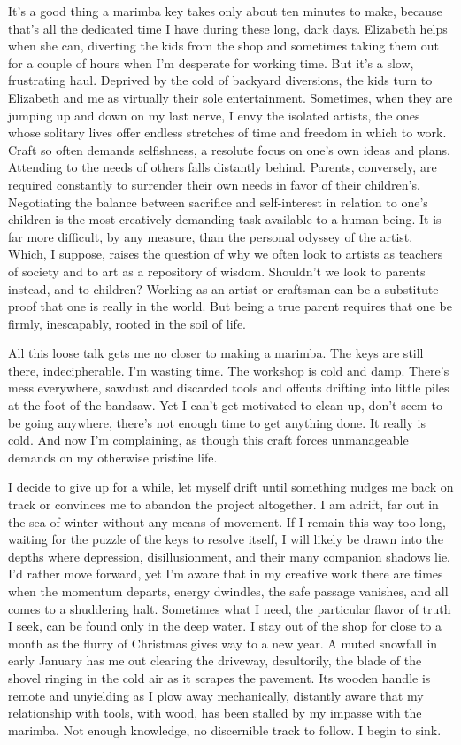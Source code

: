 \documentclass[letterpaper,10pt,headsepline]{scrreprt}
\begin{document}
It’s a good thing a marimba key takes only about ten minutes to make, because that’s all the dedicated time I have during these long, dark days. Elizabeth helps when she can, diverting the kids from the shop and sometimes taking them out for a couple of hours when I’m desperate for working time. But it’s a slow, frustrating haul. Deprived by the cold of backyard diversions, the kids turn to Elizabeth and me as virtually their sole entertainment. Sometimes, when they are jumping up and down on my last nerve, I envy the isolated artists, the ones whose solitary lives offer endless stretches of time and freedom in which to work. Craft so often demands selfishness, a resolute focus on one’s own ideas and plans. Attending to the needs of others falls distantly behind. Parents, conversely, are required constantly to surrender their own needs in favor of their children’s. Negotiating the balance between sacrifice and self-­interest in relation to one’s children is the most creatively demanding task available to a human being. It is far more difficult, by any measure, than the personal odyssey of the artist.
Which, I suppose, raises the question of why we often look to artists as teachers of society and to art as a repository of wisdom. ­Shouldn’t we look to parents instead, and to children? Working as an artist or craftsman can be a substitute proof that one is really in the world. But being a true parent requires that one be firmly, inescapably, rooted in the soil of life.

All this loose talk gets me no closer to making a marimba. The keys are still there, indecipherable. I’m wasting time. The workshop is cold and damp. There’s mess everywhere, sawdust and discarded tools and offcuts drifting into little piles at the foot of the bandsaw. Yet I ­can’t get motivated to clean up, ­don’t seem to be going anywhere, there’s not enough time to get anything done. It really is cold. And now I’m complaining, as though this craft forces unmanageable demands on my otherwise pristine life.

I decide to give up for a while, let myself drift until something nudges me back on track or convinces me to abandon the project altogether. I am adrift, far out in the sea of winter without any means of movement. If I remain this way too long, waiting for the puzzle of the keys to resolve itself, I will likely be drawn into the depths where depression, disillusionment, and their many companion shadows lie. I’d rather move forward, yet I’m aware that in my creative work there are times when the momentum departs, energy dwindles, the safe passage vanishes, and all comes to a shuddering halt. Sometimes what I need, the particular flavor of truth I seek, can be found only in the deep water.
I stay out of the shop for close to a month as the flurry of Christmas gives way to a new year. A muted snowfall in early January has me out clearing the driveway, desultorily, the blade of the shovel ringing in the cold air as it scrapes the pavement. Its wooden handle is remote and unyielding as I plow away mechanically, distantly aware that my relationship with tools, with wood, has been stalled by my impasse with the marimba. Not enough knowledge, no discernible track to follow. I begin to sink.
\end{document}
